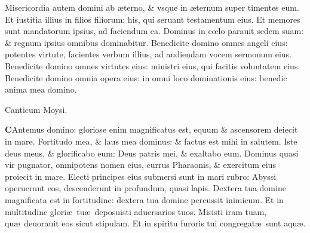 \documentclass[a5paper,10pt]{book}
\def\ae{æ}
\def\oe{œ}
\begin{document}
\begin{multicols*}{2}
\newline \color{red} M\color{black}isericordia autem domini ab \ae terno, \& vsque in \ae ternum super timentes eum.
\newline \color{red} E\color{black}t iustitia illius in filios filiorum: his, qui seruant testamentum eius.
\newline \color{red} E\color{black}t memores sunt mandatorum ipsius, ad faciendum ea.
\newline \color{red} D\color{black}ominus in c\oe lo parauit sedem suam: \& regnum ipsius omnibus dominabitur.
\newline \color{red} B\color{black}enedicite domino omnes angeli eius: potentes virtute, facientes verbum illius, ad audiendam vocem sermonum eius.
\newline \color{red} B\color{black}enedicite domino omnes virtutes eius: ministri eius, qui facitis voluntatem eius.
\newline \color{red} B\color{black}enedicite domino omnia opera eius: in omni loco dominationis eius: benedic anima mea domino.
\vspace{-1em}
\begin{center} \color{red}
Canticum Moysi.
\end{center}
\vspace{-1em}
\lettrine[lines=2]{\bfseries \color{red} C}{}Antemus domino: gloriose enim magnificatus est, equum \& ascensorem deiecit in mare.
\newline \color{red} F\color{black}ortitudo mea, \& laus mea dominus: \& factus est mihi in salutem.
\newline \color{red} I\color{black}ste deus meus, \& glorificabo eum: Deus patris mei, \& exaltabo eum.
\newline \color{red} D\color{black}ominus quasi vir pugnator, omnipotens nomen eius, currus Pharaonis, \& exercitum eius proiecit in mare.
\newline \color{red} E\color{black}lecti principes eius submersi sunt in mari rubro: Abyssi operuerunt eos, descenderunt in profundum, quasi lapis.
\newline \color{red} D\color{black}extera tua domine magnificata est in fortitudine: dextera tua domine percussit inimicum.
\newline \color{red} E\color{black}t in multitudine glori\ae \ tu\ae \ deposuisti aduersarios tuos.
\newline \color{red} M\color{black}isisti iram tuam, qu\ae \ deuorauit eos sicut stipulam. Et in spiritu furoris tui congregat\ae \ sunt aqu\ae .

\end{multicols*}
\end{document}
